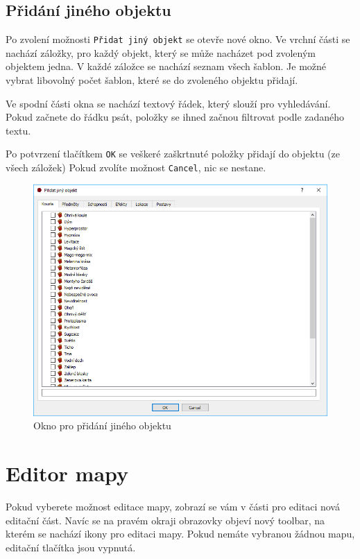 \documentclass[12pt,a4paper,oneside]{article}
\begin{document}
\subsection{Přidání jiného objektu}
Po zvolení možnosti \texttt{Přidat jiný objekt} se otevře nové okno. Ve vrchní části se nachází záložky, pro každý objekt, který se může nacházet pod zvoleným objektem jedna. V každé záložce se nachází seznam všech šablon. Je možné vybrat libovolný počet šablon, které se do zvoleného objektu přidají. \par

Ve spodní části okna se nachází textový řádek, který slouží pro vyhledávání. Pokud začnete do řádku psát, položky se ihned začnou filtrovat podle zadaného textu. \par

Po potvrzení tlačítkem \texttt{OK} se veškeré zaškrtnuté položky přidají do objektu (ze všech záložek) Pokud zvolíte možnost \texttt{Cancel}, nic se nestane.  
	\begin{figure}[h]
  		\centering  		
    		\includegraphics[width=0.8\linewidth]{images/editace_strom_another}
    		\caption{Okno pro přidání jiného objektu}
    		\label{fig:editace_strom_another}  	  		
  		\vfill
	\end{figure}
	
	\newpage
	
\section{Editor mapy}
Pokud vyberete možnost editace mapy, zobrazí se vám v části pro editaci nová editační část. Navíc se na pravém okraji obrazovky objeví nový toolbar, na kterém se nachází ikony pro editaci mapy. Pokud nemáte vybranou žádnou mapu, editační tlačítka jsou vypnutá. \par
\end{document}
